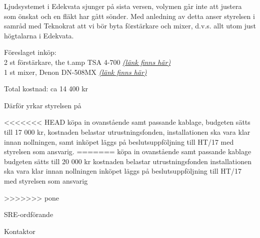 \documentclass[../_main/handlingar.tex]{subfiles}
\begin{document}
Ljudsystemet i Edekvata sjunger på sista versen, volymen går inte att justera som önskat och en fläkt har gått sönder. Med anledning av detta anser styrelsen i samråd med Teknokrat att vi bör byta förstärkare och mixer, d.v.s. allt utom just högtalarna i Edekvata.

Föreslaget inköp:\\
2 st förstärkare, the t.amp TSA 4-700 \href{https://www.thomann.de/se/the_tamp_tsa_4700.htm}{\textit{(länk finns här)}}\\
1 st mixer, Denon DN-508MX \href{https://www.thomann.de/se/denon_dn_508mx.htm}{\textit{(länk finns här)}}

Total kostnad: ca 14 400 kr

Därför yrkar styrelsen på

\begin{attsatser}
<<<<<<< HEAD
    \att köpa in ovanstående samt passande kablage,
    \att budgeten sätts till 17 000 kr,
    \att kostnaden belastar utrustningsfonden,
    \att installationen ska vara klar innan nollningen, samt
    \att inköpet läggs på beslutsuppföljning till HT/17 med styrelsen som ansvarig.
=======
    \att köpa in ovanstående samt passande kablage
    \att budgeten sätts till 20 000 kr 
    \att kostnaden belastar utrustningsfonden
    \att installationen ska vara klar innan nollningen
    \att inköpet läggs på beslutsuppföljning till HT/17 med styrelsen som ansvarig 
    
>>>>>>> pone
\end{attsatser}

\begin{signatures}{2}
    \ist
    \signature{\sreordf}{SRE-ordförande}
    \signature{Johan Karlberg}{Kontaktor}
\end{signatures}
\end{document}
